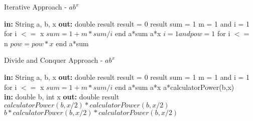 \documentclass[a4paper,12pt]{article}
\begin{document}
    \begin{algorithm}
    \caption{Iterative Approach -  $ab^x$ }
    \begin{algorithmic}
    \State \textbf{in: } String a, b, x
    \State \textbf{out: } double result
    \State  result = 0
        \Return result
    \Else 
        \State sum = 1
        \State m = 1 and i = 1
        \State for i $<=$ x 
        \State $sum = 1+m*sum/i$
        \State end
    \State \Return a*sum
        \Else 
            \EndIf
                \Return a*x
            \Else    
            \State $i=1 and pow = 1$
            \State for i $<=$ n 
            \State $pow = pow*x$
            \State end
            \State \Return a*sum
            \EndIf
    \EndIf
    \EndIf
    \EndProcedure
    \end{algorithmic}
    \end{algorithm}
    
    \begin{algorithm}
    \caption{Divide and Conquer Approach -  $ab^x$}
    \begin{algorithmic}
    \State \textbf{in: } String a, b, x
    \State \textbf{out: } double result
    \State  result = 0
        \Return result
    \Else 
        \State sum = 1
        \State m = 1 and i = 1
        \State for i $<=$ x 
        \State $sum = 1+m*sum/i$
        \State end
    \State \Return a*sum
        \Else 
            \EndIf
                \Return a*x
            \Else    
            \State \Return a*calculatorPower(b,x)
            \EndIf
    \EndIf
    \EndIf
    \EndProcedure
    \\
    \State \textbf{in: } double b, int x
    \State \textbf{out: } double result
    \State {}
    \State \Return $calculatorPower(b, x/2)*calculatorPower(b, x/2)$
    \Else
    \State \Return $b * calculatorPower(b, x/2)*calculatorPower(b, x/2)$
    \EndIf
    
    \EndProcedure
    \end{algorithmic}
    \end{algorithm}
    
\end{document}
